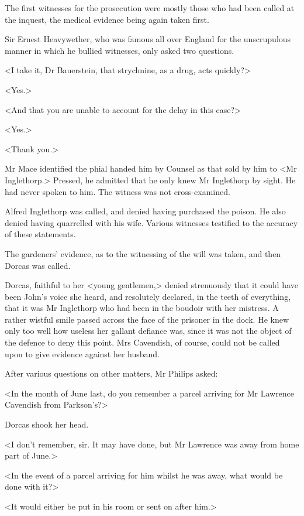  The first witnesses for the prosecution were mostly those who had been called at the inquest, the medical evidence being again taken first. 

 Sir Ernest Heavywether, who was famous all over England for the unscrupulous manner in which he bullied witnesses, only asked two questions. 

 <I take it, Dr Bauerstein, that strychnine, as a drug, acts quickly?> 

 <Yes.> 

 <And that you are unable to account for the delay in this case?> 

 <Yes.> 

 <Thank you.> 

 Mr Mace identified the phial handed him by Counsel as that sold by him to <Mr Inglethorp.> Pressed, he admitted that he only knew Mr Inglethorp by sight. He had never spoken to him. The witness was not cross-examined. 

 Alfred Inglethorp was called, and denied having purchased the poison. He also denied having quarrelled with his wife. Various witnesses testified to the accuracy of these statements. 

 The gardeners' evidence, as to the witnessing of the will was taken, and then Dorcas was called. 

 Dorcas, faithful to her <young gentlemen,> denied strenuously that it could have been John's voice she heard, and resolutely declared, in the teeth of everything, that it was Mr Inglethorp who had been in the boudoir with her mistress. A rather wistful smile passed across the face of the prisoner in the dock. He knew only too well how useless her gallant defiance was, since it was not the object of the defence to deny this point. Mrs Cavendish, of course, could not be called upon to give evidence against her husband. 

 After various questions on other matters, Mr Philips asked: 

 <In the month of June last, do you remember a parcel arriving for Mr Lawrence Cavendish from Parkson's?> 

 Dorcas shook her head. 

 <I don't remember, sir. It may have done, but Mr Lawrence was away from home part of June.> 

 <In the event of a parcel arriving for him whilst he was away, what would be done with it?> 

 <It would either be put in his room or sent on after him.> 


